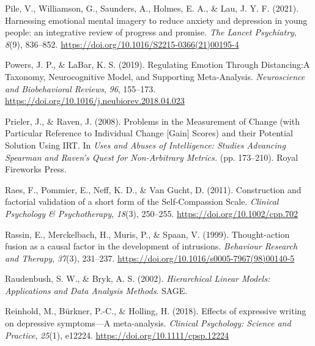 \documentclass[
  man,floatsintext]{apa7}
\newlength{\cslhangindent}
\newlength{\cslentryspacingunit} %
\newenvironment{CSLReferences}[2] %
 {%
  \setlength{\parindent}{0pt}
  \ifodd #1
  \let\oldpar\par
  \def\par{\hangindent=\cslhangindent\oldpar}
  \fi
  \setlength{\parskip}{#2\cslentryspacingunit}
 }%
 {}
\begin{document}
\begin{CSLReferences}{1}{0}
\leavevmode{}%
Pile, V., Williamson, G., Saunders, A., Holmes, E. A., \& Lau, J. Y. F. (2021). Harnessing emotional mental imagery to reduce anxiety and depression in young people: an integrative review of progress and promise. \emph{The Lancet Psychiatry}, \emph{8}(9), 836--852. \url{https://doi.org/10.1016/S2215-0366(21)00195-4}

\leavevmode{}%
Powers, J. P., \& LaBar, K. S. (2019). Regulating Emotion Through Distancing:A Taxonomy, Neurocognitive Model, and Supporting Meta-Analysis. \emph{Neuroscience and Biobehavioral Reviews}, \emph{96}, 155--173. \url{https://doi.org/10.1016/j.neubiorev.2018.04.023}

\leavevmode{}%
Prieler, J., \& Raven, J. (2008). Problems in the Measurement of Change (with Particular Reference to Individual Change {[}Gain{]} Scores) and their Potential Solution Using IRT. In \emph{Uses and Abuses of Intelligence: Studies Advancing Spearman and Raven's Quest for Non-Arbitrary Metrics.} (pp. 173--210). Royal Fireworks Press.

\leavevmode{}%
Raes, F., Pommier, E., Neff, K. D., \& Van Gucht, D. (2011). Construction and factorial validation of a short form of the Self-Compassion Scale. \emph{Clinical Psychology \& Psychotherapy}, \emph{18}(3), 250--255. \url{https://doi.org/10.1002/cpp.702}

\leavevmode{}%
Rassin, E., Merckelbach, H., Muris, P., \& Spaan, V. (1999). Thought-action fusion as a causal factor in the development of intrusions. \emph{Behaviour Research and Therapy}, \emph{37}(3), 231--237. \url{https://doi.org/10.1016/s0005-7967(98)00140-5}

\leavevmode{}%
Raudenbush, S. W., \& Bryk, A. S. (2002). \emph{Hierarchical Linear Models: Applications and Data Analysis Methods}. SAGE.

\leavevmode{}%
Reinhold, M., Bürkner, P.-C., \& Holling, H. (2018). Effects of expressive writing on depressive symptoms---A meta-analysis. \emph{Clinical Psychology: Science and Practice}, \emph{25}(1), e12224. \url{https://doi.org/10.1111/cpsp.12224}


\end{CSLReferences}
\end{document}
